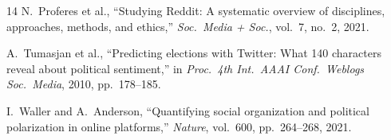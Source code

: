 \documentclass[journal]{IEEEtran}
\begin{document}
\begin{thebibliography}{14}
N.~Proferes et al.,
``Studying Reddit: A systematic overview of disciplines, approaches,
methods, and ethics,''
\textit{Soc.\ Media + Soc.}, vol.~7, no.~2, 2021.

A.~Tumasjan et al.,
``Predicting elections with Twitter: What 140 characters reveal about
political sentiment,''
in \textit{Proc.\ 4th Int.\ AAAI Conf.\ Weblogs Soc.\ Media}, 2010,
pp.~178--185.

I.~Waller and A.~Anderson,
``Quantifying social organization and political polarization in online
platforms,''
\textit{Nature}, vol.~600, pp.~264--268, 2021.

\end{thebibliography}
\end{document}
